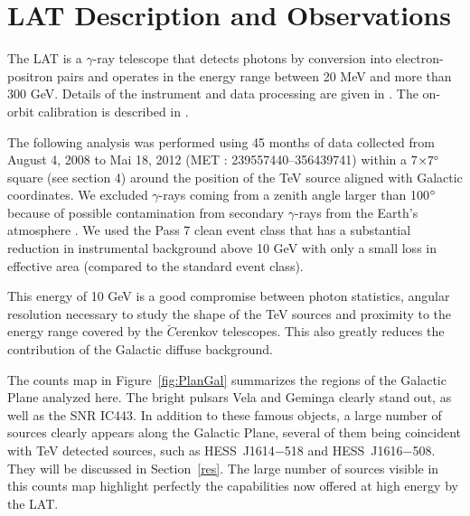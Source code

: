 \section{LAT Description and Observations}

The LAT is a $\gamma$-ray telescope that detects photons by conversion into electron-positron pairs and operates in the energy range between 20 MeV and more than 300 GeV. Details of the instrument and data processing are given in \cite{2009ApJ...697.1071A}. The on-orbit calibration is described in \cite{2009ApJ...696.1084A}.

The following analysis was performed using 45 months of data collected from August 4, 2008 to Mai 18, 2012 (MET : 239557440--356439741) within a $7$\degr $\times 7\mbox{$^\circ$}$ square (see section 4) around the position of the TeV source aligned with Galactic coordinates. We excluded $\gamma$-rays coming from a zenith angle larger than 100$\mbox{$^\circ$}$ because of possible contamination from secondary $\gamma$-rays from the Earth's atmosphere \citep{2009PhRvD..80l2004A}. We used the Pass 7 clean event class that has a substantial reduction in instrumental background above 10 GeV with only a small loss in effective area (compared to the standard event class).

This energy of 10 GeV is a good compromise between photon statistics, angular resolution necessary to study the shape of the TeV sources and proximity to the energy range covered by the $\breve{C}$erenkov telescopes. This also greatly reduces the contribution of the Galactic diffuse background.

The counts map in Figure~\ref{fig:PlanGal} summarizes the regions of the Galactic Plane analyzed here. The bright pulsars Vela and Geminga clearly stand out, as well as the SNR IC443. In addition to these famous objects, a large number of sources clearly appears along the Galactic Plane, several of them being coincident with TeV detected sources, such as HESS~J1614$-$518 and HESS~J1616$-$508. They will be discussed in Section~\ref{res}. The large number of sources visible in this counts map highlight perfectly the capabilities now offered at high energy by the LAT.




